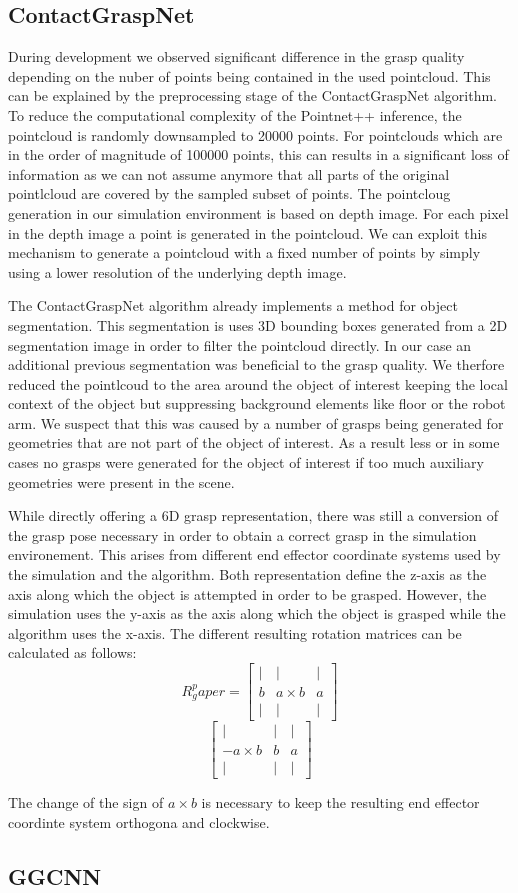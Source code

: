 \subsection{ContactGraspNet}
During development we observed significant difference in the grasp quality depending on the nuber of points being contained in the used pointcloud.
This can be explained by the preprocessing stage of the ContactGraspNet algorithm.
To reduce the computational complexity of the Pointnet++ inference, the pointcloud is randomly downsampled to 20000 points.
For pointclouds which are in the order of magnitude of 100000 points, this can results in a significant loss of information as we can not assume anymore that all parts of
the original pointlcloud are covered by the sampled subset of points.
The pointcloug generation in our simulation environment is based on depth image. For each pixel in the depth image a point is generated in the pointcloud.
We can exploit this mechanism to generate a pointcloud with a fixed number of points by simply using a lower resolution of the underlying depth image.

The ContactGraspNet algorithm already implements a method for object segmentation.
This segmentation is uses 3D bounding boxes generated from a 2D segmentation image in order to filter the pointcloud directly.
In our case an additional previous segmentation was beneficial to the grasp quality.
We therfore reduced the pointlcoud to the area around the object of interest keeping the local context of the object but suppressing background elements like floor
or the robot arm.
We suspect that this was caused by a number of grasps being generated for geometries that are not part of the object of interest.
As a result less or in some cases no grasps were generated for the object of interest if too much auxiliary geometries were present in the scene.

While directly offering a 6D grasp representation, there was still a conversion of the grasp pose necessary in order to obtain a correct grasp in the simulation environement.
This arises from different end effector coordinate systems used by the simulation and the algorithm.
Both representation define the z-axis as the axis along which the object is attempted in order to be grasped.
However, the simulation uses the y-axis as the axis along which the object is grasped while the algorithm uses the x-axis.
The different resulting rotation matrices can be calculated as follows:
$$ R_g^paper =  \begin{bmatrix}
        | & |          & | \\
        b & a \times b & a \\
        | & |          & |
    \end{bmatrix}
$$
$$
    \begin{bmatrix}
        |           & | & | \\
        -a \times b & b & a \\
        |           & | & |
    \end{bmatrix}
$$

The change of the sign of $a \times b$ is necessary to keep the resulting end effector coordinte system orthogona and clockwise.

\subsection{GGCNN}
